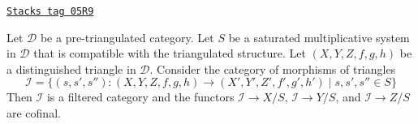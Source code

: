 \begin{lemma}
\label{derived-lemma-limit-triangles}
\href{https://stacks.math.columbia.edu/tag/05R9}{\texttt{Stacks tag 05R9}}

Let $\mathcal{D}$ be a pre-triangulated category.
Let $S$ be a saturated multiplicative system in $\mathcal{D}$
that is compatible with the triangulated structure.
Let $(X, Y, Z, f, g, h)$ be a distinguished triangle in $\mathcal{D}$.
Consider the category of morphisms of triangles
$$
\mathcal{I} =
\{(s, s', s'') : (X, Y, Z, f, g, h) \to (X', Y', Z', f', g', h')
\mid s, s', s'' \in S\}
$$
Then $\mathcal{I}$ is a filtered category and the functors
$\mathcal{I} \to X/S$, $\mathcal{I} \to Y/S$, and $\mathcal{I} \to Z/S$
are cofinal.
\end{lemma}

